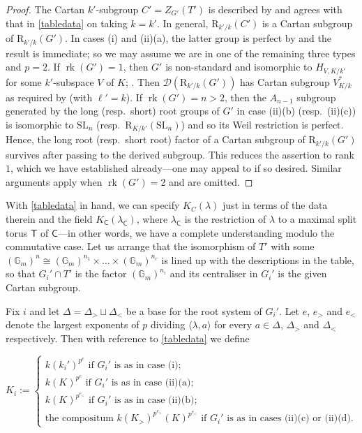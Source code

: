 \documentclass[11pt,reqno]{amsart}
\theoremstyle{definition}
\theoremstyle{remark}
\theoremstyle{definition}
\theoremstyle{plain}
\DeclareMathOperator{\rk}{rk}
\newcommand{\R}{\mathrm{R}}
\newcommand{\D}{\mathscr{D}}
\newcommand{\SL}{\mathrm{SL}}
\newcommand{\Gm}{\mathbb{G}_m}
\newcommand{\Cs}{\mathsf{C}}
\newcommand{\Ts}{\mathsf{T}}
\renewcommand{\D}{\mathscr{D}}
\begin{document}
\begin{proof}
The Cartan $k'$-subgroup $C'=Z_{G'}(T')$ is described by \cite[3.4.1,\ 8.2.5,\ 3.2.7]{CPClass} and agrees with that in \cref{tabledata} on taking $k=k'$. In general, $\R_{k'/k}(C')$ is a Cartan subgroup of $\R_{k'/k}(G')$. In cases (i) and (ii)(a), the latter group is perfect by \cite[1.3.4, 8.1.2]{CGP15} and the result is immediate; so we may assume we are in one of the remaining three types and $p=2$. If $\rk(G')=1$, then $G'$ is non-standard and isomorphic to $H_{V,K/k'}$ for some $k'$-subspace $V$ of $K$; \cite[8.1.1]{CPClass}. Then $\D(\R_{k'/k}(G'))$ has Cartan subgroup $V^*_{K/k}$ as required by \cite[8.1.3]{CPClass} (with $\ell'=k$). If $\rk(G')=n>2$, then the $A_{n-1}$ subgroup generated by the long (resp.~short) root groups of $G'$ in case (ii)(b) (resp.~(ii)(c)) is isomorphic to $\SL_{n}$ (resp.~$\R_{K/k'}(\SL_{n})$) and so its Weil restriction is perfect. Hence, the long root (resp.~short root) factor of a Cartan subgroup of $\R_{k'/k}(G')$ survives after passing to the derived subgroup. This reduces the assertion to rank $1$, which we have established already---one may appeal to \cite[C.2.32]{CGP15} if so desired. Similar arguments apply when $\rk(G')=2$ and are omitted.
\end{proof}

With \cref{tabledata} in hand, we can specify $K_C(\lambda)$ just in terms of the data therein and the field $K_{\Cs}(\lambda_\Cs)$, where $\lambda_\Cs$ is the restriction of $\lambda$ to a maximal split torus $\Ts$ of $\Cs$---in other words, we have a complete understanding modulo the commutative case. Let us arrange that the isomorphism of $T'$ with some $(\Gm)^n\cong (\Gm)^{n_1}\times\dots\times (\Gm)^{n_r}$ is lined up with the descriptions in the table, so that $G_i'\cap T'$ is the factor $(\Gm)^{n_i}$ and its centraliser in $G_i'$ is the given Cartan subgroup.

 Fix $i$ and let $\Delta=\Delta_>\sqcup\Delta_<$ be a base for the root system of $G_i'$. Let $e$, $e_>$ and $e_<$ denote the largest exponents of $p$ dividing $\langle\lambda,a\rangle$ for every $a\in \Delta$, $\Delta_>$ and $\Delta_<$ respectively. Then with reference to \cref{tabledata} we define

\begin{equation}K_i:=\begin{cases}
  k(k_i')^{p^{e}}\text{ if $G_i'$ is as in case (i)};\\
  k(K)^{p^{e}}\text{ if $G_i'$ is as in case (ii)(a)};\\
  k(K)^{p^{e_<}}\text{ if $G_i'$ is as in case (ii)(b);}\\
  \text{the compositum }k(K_>)^{p^{e_>}}(K)^{p^{e_<}}\text{ if $G_i'$ is as in cases (ii)(c) or (ii)(d)}.
\end{cases}\label{theki}\end{equation}
\end{document}
